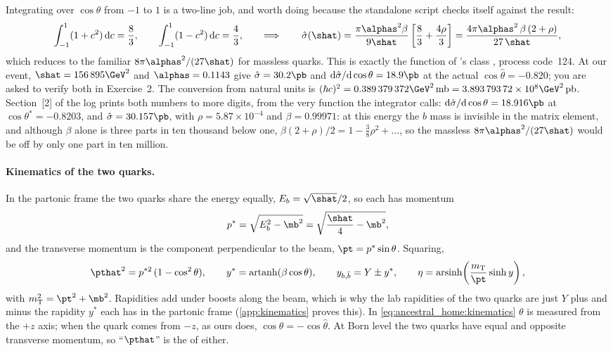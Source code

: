 Integrating over $\cos\theta$ from $-1$ to $1$ is a two-line job, and worth
doing because the standalone script checks itself against the result:
\begin{equation}
  \int_{-1}^{1}(1+c^2)\,\mathrm{d}c=\frac83,\qquad
  \int_{-1}^{1}(1-c^2)\,\mathrm{d}c=\frac43,\qquad\Longrightarrow\qquad
  \hat\sigma(\shat) = \frac{\pi\alphas^2\beta}{9\shat}\left[\frac83+\frac{4\rho}{3}\right]
  = \frac{4\pi\alphas^2\,\beta\,(2+\rho)}{27\,\shat},
  \label{eq:ancestral_home:sigmahat}
\end{equation}
which reduces to the familiar $8\pi\alphas^2/(27\shat)$ for massless quarks.
This is exactly the function  of \PYTHIA's class
, process code~124. At our event,
$\shat=156\,895\GeV^2$ and $\alphas=0.1143$ give $\hat\sigma=30.2\pb$ and
$\mathrm{d}\hat\sigma/\mathrm{d}\cos\theta=18.9\pb$ at the actual
$\cos\hat\theta=-0.820$; you are asked to verify both in Exercise~2. The
conversion from natural units is
$(\hbar c)^2 = 0.389\,379\,372\GeV^2\,\mathrm{mb} = 3.893\,793\,72\times10^{8}\GeV^2\,\mathrm{pb}$.
Section~[2] of the log prints both numbers to more digits, from the very
function the integrator calls: $\mathrm{d}\hat\sigma/\mathrm{d}\cos\theta=18.916\pb$
at $\cos\theta^*=-0.8203$, and $\hat\sigma=30.157\pb$, with $\rho=5.87\times10^{-4}$
and $\beta=0.99971$: at this energy the $b$ mass is invisible in the matrix
element, and although $\beta$ alone is three parts in ten thousand below one, $\beta(2+\rho)/2=1-\tfrac38\rho^2+\dots$, so the massless $8\pi\alphas^2/(27\shat)$ would be off by only one part in ten million.

\paragraph{Kinematics of the two quarks.} In the partonic frame the two
quarks share the energy equally, $E_b=\sqrt{\shat}/2$, so each has momentum
\begin{equation}
  p^{*}=\sqrt{E_b^2-\mb^2}=\sqrt{\frac{\shat}{4}-\mb^2},
  \label{eq:ancestral_home:pstar}
\end{equation}
and the transverse momentum is the component perpendicular to the beam,
$\pt=p^{*}\sin\theta$. Squaring,
\begin{equation}
  \pthat^2 = p^{*2}\,(1-\cos^2\theta),\qquad
  y^{*} = \operatorname{artanh}(\beta\cos\theta),\qquad
  y_{b,\bar b} = Y \pm y^{*},\qquad
  \eta = \operatorname{arsinh}\!\left(\frac{m_{\mathrm{T}}}{\pt}\sinh y\right),
  \label{eq:ancestral_home:kinematics}
\end{equation}
with $m_{\mathrm{T}}^2=\pt^2+\mb^2$. Rapidities add under boosts along the
beam, which is why the lab rapidities of the two quarks are just $Y$ plus and
minus the rapidity $y^{*}$ each has in the partonic frame (\cref{app:kinematics} proves this). In \cref{eq:ancestral_home:kinematics} $\theta$ is measured from the $+z$ axis; when the quark comes from $-z$, as ours does, $\cos\theta=-\cos\hat\theta$. At Born level the two quarks have equal
and opposite transverse momentum, so ``$\pthat$'' is the \pt of either.

